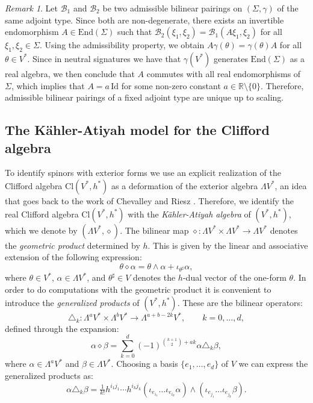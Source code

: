 \documentclass[10pt,reqno]{amsart}
\theoremstyle{definition}
\theoremstyle{remark}
\newtheorem{remark}[theorem]{Remark}
\newcommand{\R}{\mathbb{R}}
\newcommand{\Id}{\mathrm{Id}}
\newcommand{\End}{\mathrm{End}}
\begin{document}
\begin{remark}
    Let $\mathscr{B}_1$ and $\mathscr{B}_2$ be two admissible bilinear pairings on $(\Sigma,\gamma)$ of the same adjoint type. Since both are non-degenerate, there exists an invertible endomorphism $A\in\End(\Sigma)$ such that $\mathscr{B}_2(\xi_1,\xi_2)=\mathscr{B}_1(A\xi_1,\xi_2)$ for all $\xi_1,\xi_2\in\Sigma$. Using the admissibility property, we obtain $A\gamma(\theta)=\gamma(\theta)A$ for all $\theta\in V^*$. Since in neutral signatures we have that $\gamma(V^*)$ generates $\End(\Sigma)$ as a real algebra, we then conclude that $A$ commutes with all real endomorphisms of $\Sigma$, which implies that $A=a\,\Id$ for some non-zero constant $a\in\R\setminus\{0\}$. Therefore, admissible bilinear pairings of a fixed adjoint type are unique up to scaling.
\end{remark}

\subsection{The Kähler-Atiyah model for the Clifford algebra}

To identify spinors with exterior forms we use an explicit realization of the Clifford algebra $\mathrm{Cl}(V^*,h^*)$ as a deformation of the exterior algebra $\Lambda V^*$, an idea that goes back to the work of Chevalley and Riesz \cite{Chevalley1954,Chevalley1955,Riesz1993}. Therefore, we identify the real Clifford algebra $\mathrm{Cl}(V^*,h^*)$ with the \emph{Kähler-Atiyah algebra} of $(V^*,h^*)$, which we denote by $(\Lambda V^*,\diamond)$. The bilinear map $\diamond\colon\Lambda V^*\times\Lambda V^*\to\Lambda V^*$ denotes the \emph{geometric product} determined by $h$. This is given by the linear and associative extension of the following expression: \begin{equation*}\label{eq:def_geometric_product}
    \theta\diamond\alpha=\theta\wedge\alpha+\iota_{\theta^\sharp}\alpha,
\end{equation*} where $\theta\in V^*$, $\alpha\in\Lambda V^*$, and $\theta^\sharp\in V$ denotes the $h$-dual vector of the one-form $\theta$. In order to do computations with the geometric product it is convenient to introduce the \emph{generalized products} of $(V^*,h^*)$. These are the bilinear operators: $$\triangle_k\colon\Lambda^a V^*\times\Lambda^b V^*\to\Lambda^{a+b-2k}V^*,\qquad k=0,\ldots,d,$$ defined through the expansion: $$\alpha\diamond\beta=\sum_{k=0}^d(-1)^{\binom{k+1}{2}+ak}\alpha\triangle_k\beta,$$ where $\alpha\in\Lambda^aV^*$ and $\beta\in\Lambda V^*$. Choosing a basis $\{e_1,\ldots,e_d\}$ of $V$ we can express the generalized products as: $$\alpha\triangle_k\beta=\tfrac{1}{k!}h^{i_1j_1}\cdots h^{i_kj_k}(\iota_{e_{i_1}}\ldots\iota_{e_{i_k}}\alpha)\wedge(\iota_{e_{j_1}}\ldots\iota_{e_{j_k}}\beta).$$
\end{document}
